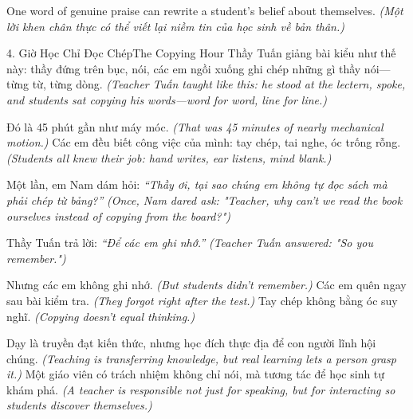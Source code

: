 \begin{ghinhoanh}
One word of genuine praise can rewrite a student's belief about themselves.
\textit{(Một lời khen chân thực có thể viết lại niềm tin của học sinh về bản thân.)}
\end{ghinhoanh}

\begin{truyen}{4. Giờ Học Chỉ Đọc Chép}{The Copying Hour}
Thầy Tuấn giảng bài kiểu như thế này: thầy đứng trên bục, nói, các em ngồi xuống ghi chép những gì thầy nói—từng từ, từng dòng.
\textit{(Teacher Tuấn taught like this: he stood at the lectern, spoke, and students sat copying his words—word for word, line for line.)}

Đó là 45 phút gần như máy móc.
\textit{(That was 45 minutes of nearly mechanical motion.)}
Các em đều biết công việc của mình: tay chép, tai nghe, óc trống rỗng.
\textit{(Students all knew their job: hand writes, ear listens, mind blank.)}

Một lần, em Nam dám hỏi: \textit{``Thầy ơi, tại sao chúng em không tự đọc sách mà phải chép từ bảng?''}
\textit{(Once, Nam dared ask: "Teacher, why can't we read the book ourselves instead of copying from the board?")}

Thầy Tuấn trả lời: \textit{``Để các em ghi nhớ.''}
\textit{(Teacher Tuấn answered: "So you remember.")}

Nhưng các em không ghi nhớ.
\textit{(But students didn't remember.)}
Các em quên ngay sau bài kiểm tra.
\textit{(They forgot right after the test.)}
Tay chép không bằng óc suy nghĩ.
\textit{(Copying doesn't equal thinking.)}
\end{truyen}

\begin{baihoc}
Dạy là truyền đạt kiến thức, nhưng học đích thực địa để con người lĩnh hội chúng.
\textit{(Teaching is transferring knowledge, but real learning lets a person grasp it.)}
Một giáo viên có trách nhiệm không chỉ nói, mà tương tác để học sinh tự khám phá.
\textit{(A teacher is responsible not just for speaking, but for interacting so students discover themselves.)}
\end{baihoc}

